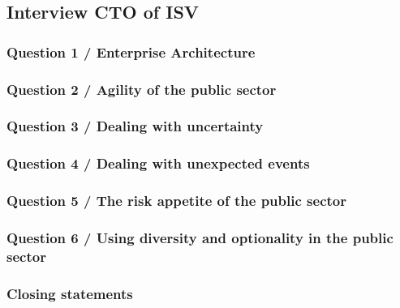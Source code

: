 \subsection{Interview CTO of ISV}
\label{sub:interviewctoisv}

\subsubsection{Question 1 / Enterprise Architecture}

\subsubsection{Question 2 / Agility of the public sector}

\subsubsection{Question 3 / Dealing with uncertainty}

\subsubsection{Question 4 / Dealing with unexpected events}

\subsubsection{Question 5 / The risk appetite of the public sector}

\subsubsection{Question 6 / Using diversity and optionality in the public sector}

\subsubsection{Closing statements}